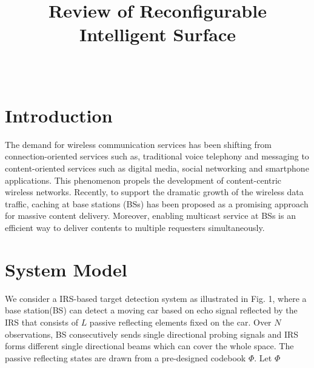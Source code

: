 \documentclass[12pt, draftclsnofoot, journal, letterpaper, onecolumn]{IEEEtran}
\begin{document}
\title{Review of Reconfigurable Intelligent Surface}


\author{\\
}

\maketitle

\vspace{-1.5cm}
\section{Introduction}
The demand for wireless communication services has been shifting from connection-oriented services such as, traditional voice telephony and messaging to content-oriented services such as digital media, social networking and smartphone applications.
This phenomenon propels the development of content-centric wireless networks\cite{liuhui}.
Recently, to support the dramatic growth of the wireless data traffic, caching at base stations (BSs) has been proposed as a promising approach for massive content delivery\cite{femto}. Moreover, enabling multicast service at BSs is an efficient way to deliver contents to multiple requesters simultaneously\cite{embms}.
\section{System Model}
We consider a IRS-based target detection system as illustrated in Fig. 1, where a base station(BS) can detect a moving car based on echo signal reflected by the IRS that consists of $L$ passive reflecting elements fixed on the car. Over $N$ observations, BS consecutively sends single directional probing signals and IRS forms different single directional beams which can cover the whole space. The passive reflecting states are drawn from a pre-designed codebook \textbf{$\Phi$}. Let \textbf{$\Phi$}



\end{document}
